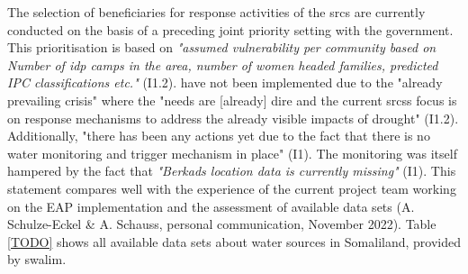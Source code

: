 The selection of beneficiaries for response activities of the \acrshort*{srcs} are currently conducted on the basis of a preceding joint priority setting with the government. This prioritisation is based on \textit{"assumed vulnerability per community based on Number of \acrfull{idp} camps in the area, number of women headed families, predicted IPC classifications etc."} (I1.2).  have not been implemented due to the "already prevailing crisis" where the "needs are [already] dire and the current \acrshort*{srcs}s focus is on response mechanisms to address the already visible impacts of drought" (I1.2). Additionally, "there has been any actions yet due to the fact that there is no water monitoring and trigger mechanism in place" (I1). The monitoring was itself hampered by the fact that \textit{"Berkads location data is currently missing"} (I1). This statement compares well with the experience of the current project team working on the EAP implementation and the assessment of available data sets (A. Schulze-Eckel \& A. Schauss, personal communication, November 2022).\newline
Table \ref*{TODO} shows all available data sets about water sources in Somaliland, provided by \acrshort*{swalim}. %


